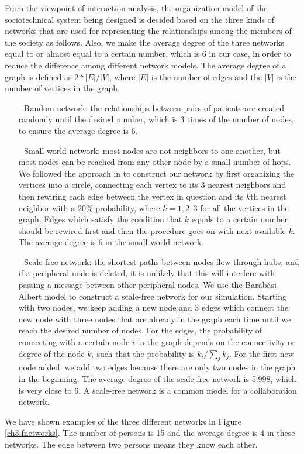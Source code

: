 From the viewpoint of interaction analysis, the organization model of the sociotechnical system being designed is decided based on the three kinds of networks that are used for representing the relationships among the members of the society as follows. Also, we make the average degree of the three networks equal to or almost equal to a certain number, which is 6 in our case, in order to reduce the difference among different network models. The average degree of a graph is defined as $2*|E|/|V|$, where $|E|$ is the number of edges and the $|V|$ is the number of vertices in the graph.
\begin{itemize}
\item[-]Random network: the relationships between pairs of patients are created randomly until the desired number, which is 3 times of the number of nodes, to ensure the average degree is 6.
\item[-]Small-world network: most nodes are not neighbors to one another, but most nodes can be reached from any other node by a small number of hops. We followed the approach in \cite{watts1998} to construct our network by first organizing the vertices into a circle, connecting each vertex to its 3 nearest neighbors and then rewiring each edge between the vertex in question and its $k$th nearest neighbor with a 20\% probability, where $k=1, 2, 3$ for all the vertices in the graph. Edges which satisfy the condition that $k$ equals to a certain number should be rewired first and then the procedure goes on with next available $k$. The average degree is 6 in the small-world network.
\item[-]Scale-free network: the shortest paths between nodes flow through hubs, and if a peripheral node is deleted, it is unlikely that this will interfere with passing a message between other peripheral nodes. We use the Barab{\'a}si-Albert model \cite{barabasi1999} to construct a scale-free network for our simulation. Starting with two nodes, we keep adding a new node and 3 edges which connect the new node with three nodes that are already in the graph each time until we reach the desired number of nodes. For the edges, the probability of connecting with a certain node $i$ in the graph depends on the connectivity or degree of the node $k_i$ such that the probability is $k_i/\sum_{j}k_j$. For the first new node added, we add two edges because there are only two nodes in the graph in the beginning. The average degree of the scale-free network is 5.998, which is very close to 6. A scale-free network is a common model for a collaboration network.
\end{itemize}
We have shown examples of the three different networks in Figure \ref{ch3:fnetworks}. The number of persons is 15 and the average degree is 4 in these networks. The edge between two persons means they know each other.

